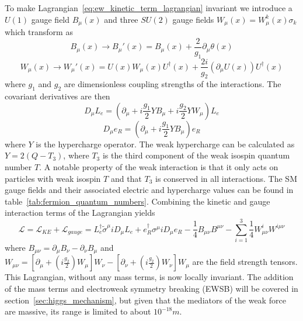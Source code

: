 To make Lagrangian~\ref{eq:ew_kinetic_term_lagrangian} invariant we introduce a $U\left(1\right)$ gauge field $B_{\mu}\left(x\right)$ and three $SU\left(2\right)$ gauge fields $W_{\mu}\left(x\right)=W_{\mu}^{k}\left(x\right)\sigma_{k}$ which transform as
\begin{equation}
	B_{\mu}\left(x\right){\rightarrow}B_{\mu}'\left(x\right)=B_{\mu}\left(x\right)+\frac{2}{g_{1}}\partial_{\mu}\theta\left(x\right)
\end{equation}
\begin{equation}
	W_{\mu}\left(x\right){\rightarrow}W_{\mu}'\left(x\right)=U\left(x\right)W_{\mu}\left(x\right)U^{\dagger}\left(x\right)+\frac{2i}{g_{2}}\left(\partial_{\mu}U\left(x\right)\right)U^{\dagger}\left(x\right)
\end{equation}
where $g_{1}$ and $g_{2}$ are dimensionless coupling strengths of the interactions.
The covariant derivatives are then
\begin{equation}
	D_{\mu}L_{e}=\left(\partial_{\mu}+i\frac{g_{1}}{2}YB_{\mu}+i\frac{g_{2}}{2}YW_{\mu}\right)L_{e}
\end{equation}
\begin{equation}
	D_{\mu}e_{R}=\left(\partial_{\mu}+i\frac{g_{1}}{2}YB_{\mu}\right)e_{R}
\end{equation}
where $Y$ is the hypercharge operator.
The weak hypercharge can be calculated as $Y=2\left(Q-T_{3}\right)$, where $T_{3}$ is the third component of the weak isospin quantum number $T$.
A notable property of the weak interaction is that it only acts on particles with weak isospin $T$ and that $T_{3}$ is conserved in all interactions.
The SM gauge fields and their associated electric and hypercharge values can be found in table~\ref{tab:fermion_quantum_numbers}.
Combining the kinetic and gauge interaction terms of the Lagrangian yields
\begin{equation}\label{eq:electron_electroweak_lagrangian}
	\mathcal{L}=\mathcal{L}_{KE}+\mathcal{L}_{gauge}=L_{e}^{\dagger}\tilde{\sigma}^{\mu}iD_{\mu}L_{e}+e_{R}^{\dagger}\sigma^{\mu}iD_{\mu}e_{R}-\frac{1}{4}B_{\mu\nu}B^{\mu\nu}-\sum_{i=1}^{3}\frac{1}{4}W_{\mu\nu}^{i}W^{i\mu\nu}
\end{equation}
where $B_{\mu\nu}=\partial_{\mu}B_{\nu}-\partial_{\nu}B_{\mu}$ and $W_{\mu\nu}=\left[\partial_{\mu}+\left(i\frac{g_{2}}{2}\right)W_{\mu}\right]W_{\nu}-\left[\partial_{\nu}+\left(i\frac{g_{2}}{2}\right)W_{\nu}\right]W_{\mu}$ are the field strength tensors.
This Lagrangian, without any mass terms, is now locally invariant.
The addition of the mass terms and electroweak symmetry breaking (EWSB) will be covered in section~\ref{sec:higgs_mechanism}, but given that the mediators of the weak force are massive, its range is limited to about $10^{-18}\unit{m}$.

